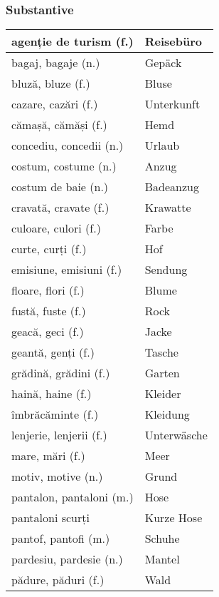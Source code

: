 \documentclass[11pt, oneside]{article}
\begin{document}
\subsubsection*{Substantive}
\begin{center}
  \begin{tabular}{ | p{6cm}| p{6cm} | } 
    \hline
    agenție de turism (f.) & Reisebüro\\
    \hline
    bagaj, bagaje (n.) & Gepäck\\
    \hline
    bluză, bluze (f.) & Bluse\\
    \hline
    cazare, cazări (f.) & Unterkunft\\
    \hline
    cămașă, cămăși (f.) & Hemd\\
    \hline
    concediu, concedii (n.) & Urlaub\\
    \hline
    costum, costume (n.) & Anzug\\
    \hline
    costum de baie (n.) & Badeanzug\\
    \hline
    cravată, cravate (f.) & Krawatte\\
    \hline
    culoare, culori (f.) & Farbe\\
    \hline
    curte, curți (f.) & Hof\\
    \hline
    emisiune, emisiuni (f.) & Sendung\\
    \hline
    floare, flori (f.) & Blume\\
    \hline
    fustă, fuste (f.) & Rock\\
    \hline
    geacă, geci (f.) & Jacke\\
    \hline
    geantă, genți (f.) & Tasche\\
    \hline
    grădină, grădini (f.) & Garten\\
    \hline
    haină, haine (f.) & Kleider\\
    \hline
    îmbrăcăminte (f.) & Kleidung\\
    \hline
    lenjerie, lenjerii (f.) & Unterwäsche\\
    \hline
    mare, mări (f.) & Meer\\
    \hline
    motiv, motive (n.) & Grund\\
    \hline
    pantalon, pantaloni (m.) & Hose\\
    \hline
    pantaloni scurți & Kurze Hose\\
    \hline
    pantof, pantofi (m.) & Schuhe\\
    \hline
    pardesiu, pardesie (n.) & Mantel\\
    \hline
    pădure, păduri (f.) & Wald\\

\end{tabular}
\end{center}
\end{document}
